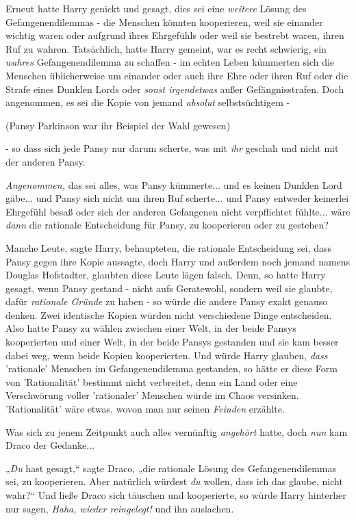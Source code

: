 {Erneut hatte Harry genickt und gesagt, dies sei eine \emph{weitere} Lösung des Gefangenendilemmas - die Menschen könnten kooperieren, weil sie einander wichtig waren oder aufgrund ihres Ehrgefühls oder weil sie bestrebt waren, ihren Ruf zu wahren. Tatsächlich, hatte Harry gemeint, war es recht schwierig, ein \emph{wahres} Gefangenendilemma zu schaffen - im echten Leben kümmerten sich die Menschen üblicherweise um einander oder auch ihre Ehre oder ihren Ruf oder die Strafe eines Dunklen Lords oder \emph{sonst irgendetwas} außer Gefängnisstrafen. Doch angenommen, es sei die Kopie von jemand \emph{absolut} selbstsüchtigem -

(Pansy Parkinson war ihr Beispiel der Wahl gewesen)

- so dass sich jede Pansy nur darum scherte, was mit \emph{ihr} geschah und nicht mit der anderen Pansy.

\emph{Angenommen,} das sei alles, was Pansy kümmerte... und es keinen Dunklen Lord gäbe... und Pansy sich nicht um ihren Ruf scherte... und Pansy entweder keinerlei Ehrgefühl besaß oder sich der anderen Gefangenen nicht verpflichtet fühlte... wäre \emph{dann} die rationale Entscheidung für Pansy, zu kooperieren oder zu gestehen?

Manche Leute, sagte Harry, behaupteten, die rationale Entscheidung sei, dass Pansy gegen ihre Kopie aussagte, doch Harry und außerdem noch jemand namens Douglas Hofstadter, glaubten diese Leute lägen falsch. Denn, so hatte Harry gesagt, wenn Pansy gestand - nicht aufs Geratewohl, sondern weil sie glaubte, dafür \emph{rationale Gründe} zu haben - so würde die andere Pansy exakt genauso denken. Zwei identische Kopien würden nicht verschiedene Dinge entscheiden. Also hatte Pansy zu wählen zwischen einer Welt, in der beide Pansys kooperierten und einer Welt, in der beide Pansys gestanden und sie kam besser dabei weg, wenn beide Kopien kooperierten. Und würde Harry glauben, \emph{dass} 'rationale' Menschen im Gefangenendilemma gestanden, so hätte er diese Form von 'Rationalität' bestimmt nicht verbreitet, denn ein Land oder eine Verschwörung voller 'rationaler' Menschen würde im Chaos versinken. 'Rationalität' wäre etwas, wovon man nur seinen \emph{Feinden} erzählte.

Was sich zu jenem Zeitpunkt auch alles vernünftig \emph{angehört} hatte, doch \emph{nun} kam Draco der Gedanke...

„\emph{Du} hast gesagt,“ sagte Draco, „die rationale Lösung des Gefangenendilemmas sei, zu kooperieren. Aber natürlich würdest \emph{du} wollen, dass ich das glaube, nicht wahr?“ Und ließe Draco sich täuschen und kooperierte, so würde Harry hinterher nur sagen, \emph{Haha, wieder reingelegt!} und ihn auslachen.

}
